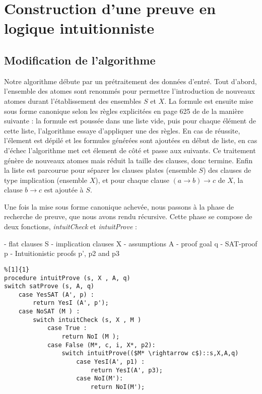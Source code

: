 \section{Construction d'une preuve en logique intuitionniste}

\subsection{Modification de l'algorithme}

Notre algorithme d\'ebute par un pr\'etraitement des donn\'ees d'entr\'e.
Tout d'abord, l'ensemble des atomes sont renomm\'es pour permettre l'introduction de nouveaux atomes durant l'\'etablissement des ensembles $S$ et $X$. La formule est ensuite mise sous forme canonique selon les r\`egles explicit\'ees en page 625 de \cite{intuit2015} de la mani\`ere suivante : la formule est pouss\'ee dans une liste vide, puis pour chaque élément de cette liste, l'algorithme essaye d'appliquer une des r\`egles. En cas de réussite, l'\'element est d\'epil\'e et les formules g\'en\'er\'ees sont ajout\'ees en d\'ebut de liste, en cas d'\'echec l'algorithme met cet \'element de c\^ot\'e et passe aux suivants. Ce traitement g\'en\`ere de nouveaux atomes mais r\'eduit la taille des clauses, donc termine. Enfin la liste est parcourue pour s\'eparer les clauses plates (ensemble $S$) des clauses de type implication (ensemble $X$), et pour chaque clause $(a \rightarrow b) \rightarrow c$ de $X$, la clause $b \rightarrow c$ est ajout\'ee \`a $S$.

Une fois la mise sous forme canonique achev\'ee, nous passons à la phase de recherche de preuve, que nous avons rendu récursive. Cette phase se compose de deux fonctions, \textit{intuitCheck} et \textit{intuitProve} :


- flat clauses S
- implication clauses X
- assumptions A
- proof goal q
- SAT-proof p
- Intuitionistic proofs p', p2 and p3

\begin{lstlisting}%[1]{1}
procedure intuitProve (s, X , A, q)
switch satProve (s, A, q)
    case YesSAT (A', p) :
        return YesI (A', p');
    case NoSAT (M ) :
        switch intuitCheck (s, X , M )
            case True :
                return NoI (M );
            case False (M*, c, i, X*, p2):
                switch intuitProve(($M* \rightarrow c$)::s,X,A,q)
                    case YesI(A', p1) :
                        return YesI(A', p3);
                    case NoI(M'):
                        return NoI(M');
\end{lstlisting}

